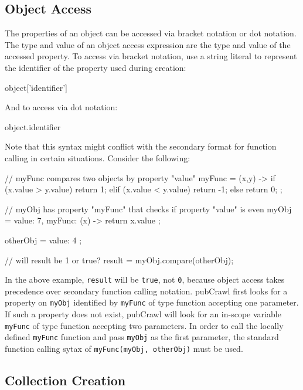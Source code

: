 \documentclass[oneside]{book}
\begin{document}
\subsection{Object Access}

The properties of an object can be accessed via bracket notation or dot notation. The type and value of an object access expression are the type and value of the accessed property. To access via bracket notation, use a string literal to represent the identifier of the property used during creation:
\begin{code}
object['identifier']
\end{code}
And to access via dot notation:
\begin{code}
object.identifier
\end{code}
Note that this syntax might conflict with the secondary format for function calling in certain situations. Consider the following:

\begin{mdframed}
[hidealllines=true,backgroundcolor=gray!10,skipbelow=.5em,skipabove=.5em]
\begin{code}
// myFunc compares two objects by property "value"
myFunc = (x,y) -> {
  if (x.value > y.value) {
    return 1;
  }
  elif (x.value < y.value) {
    return -1;
  }
  else {
    return 0;
  }
};

// myObj has property "myFunc" that checks if property "value" is even 
myObj = {
  value: 7,
  myFunc: (x) -> {
    return x.value %
  }
};

otherObj = {
  value: 4
};

// will result be 1 or true?
result = myObj.compare(otherObj);
\end{code}
\end{mdframed}
In the above example, \texttt{result} will be \texttt{true}, not \texttt{0}, because object access takes precedence over secondary function calling notation. pubCrawl first looks for a property on \texttt{myObj} identified by \texttt{myFunc} of type function accepting one parameter. If such a property does not exist, pubCrawl will look for an in-scope variable \texttt{myFunc} of type function accepting two parameters. In order to call the locally defined \texttt{myFunc} function and pass \texttt{myObj} as the first parameter, the standard function calling sytax of \texttt{myFunc(myObj, otherObj)} must be used.

\subsection{Collection Creation}
\end{document}
